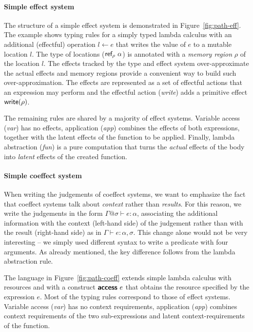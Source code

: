 
\paragraph{Simple effect system}
The structure of a simple effect system is demonstrated in Figure~\ref{fig:path-eff}. The example
shows typing rules for a simply typed lambda calculus with an additional (effectful) operation
$l \leftarrow e$ that writes the value of $e$ to a mutable location $l$. The type of locations
($\textnormal{\sffamily ref}_\rho~\alpha$) is annotated with a \emph{memory region} $\rho$ of the location $l$.
The effects tracked by the type and effect system over-approximate the actual effects and memory
regions provide a convenient way to build such over-approximation. The effects are 
represented as a set of effectful actions that an expression may perform and the effectful action
(\emph{write}) adds a primitive effect $\textnormal{\sffamily write}(\rho)$.

The remaining rules are shared by a majority of effect systems. Variable access (\emph{var}) 
has no effects, application (\emph{app}) combines the effects of both expressions, together with 
the latent effects of the function to be applied. Finally, lambda abstraction (\emph{fun}) is a
pure computation that turns the \emph{actual} effects of the body into \emph{latent} effects of 
the created function.


\paragraph{Simple coeffect system}
When writing the judgements of coeffect systems, we want to emphasize the fact that coeffect 
systems talk about \emph{context} rather than \emph{results}. For this reason, we write the 
judgements in the form $\Gamma @ \sigma \vdash e : \alpha$, associating the additional information
with the context (left-hand side) of the judgement rather than with the result (right-hand side)
as in $\Gamma \vdash e : \alpha, \sigma$. This change alone would not be very interesting -- we 
simply used different syntax to write a predicate with four arguments. As already mentioned, the 
key difference follows from the lambda abstraction rule. 

The language in Figure~\ref{fig:path-coeff} extends simple lambda calculus with resources and
with a construct $\textnormal{\bfseries\sffamily access}~e$ that obtains the resource specified by the expression $e$.
Most of the typing rules correspond to those of effect systems. Variable access (\emph{var}) 
has no context requirements, application (\emph{app}) combines context requirements of the two
sub-expressions and latent context-requirements of the function. 

